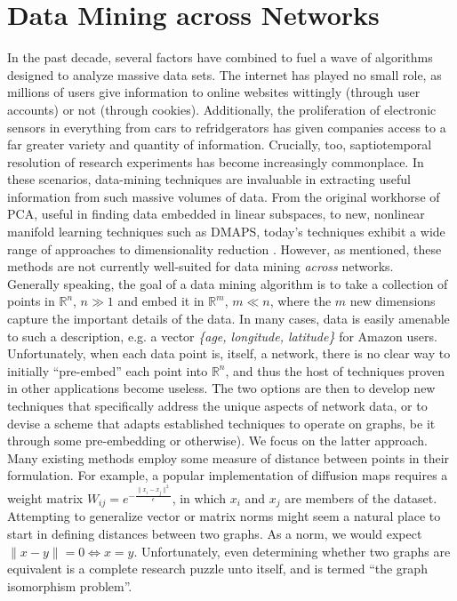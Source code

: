 \documentclass[11pt]{article}
\begin{document}
\section{Data Mining across Networks}
\indent In the past decade, several factors have combined to fuel a wave of algorithms designed to analyze massive data sets. The internet has played no small role, as millions of users give information to online websites wittingly (through user accounts) or not (through cookies). Additionally, the proliferation of electronic sensors in everything from cars to refridgerators has given companies access to a far greater variety and quantity of information. Crucially, too, saptiotemporal resolution of research experiments has become increasingly commonplace. In these scenarios, data-mining techniques are invaluable in extracting useful information from such massive volumes of data. From the original workhorse of PCA, useful in finding data embedded in linear subspaces, to new, nonlinear manifold learning techniques such as DMAPS, today's techniques exhibit a wide range of approaches to dimensionality reduction \cite{data mining papers}. However, as mentioned, these methods are not currently well-suited for data mining \textit{across} networks. \vspace{1mm}\\ 
\indent Generally speaking, the goal of a data mining algorithm is to take a collection of points in $\mathbb{R}^{n}$, $n\gg1$ and embed it in $\mathbb{R}^{m}$, $m \ll n$, where the $m$ new dimensions capture the important details of the data. In many cases, data is easily amenable to such a description, e.g. a vector \textit{\{age, longitude, latitude\}} for Amazon users. Unfortunately, when each data point is, itself, a network, there is no clear way to initially ``pre-embed'' each point into $\mathbb{R}^{n}$, and thus the host of techniques proven in other applications become useless. The two options are then to develop new techniques that specifically address the unique aspects of network data, or to devise a scheme that adapts established techniques to operate on graphs, be it through some pre-embedding or otherwise). We focus on the latter approach. \vspace{1mm}\\
\indent Many existing methods employ some measure of distance between points in their formulation. For example, a popular implementation of diffusion maps requires a weight matrix $W_{ij}=e^{-\frac{\|x_{i}-x_{j}\|^{2}}{\epsilon}}$, in which $x_{i}$ and $x_{j}$ are members of the dataset. Attempting to generalize vector or matrix norms might seem a natural place to start in defining distances between two graphs. As a norm, we would expect $\| x - y \| = 0 \Leftrightarrow x = y$. Unfortunately, even determining whether two graphs are equivalent is a complete research puzzle unto itself, and is termed ``the graph isomorphism problem''.
\end{document}
